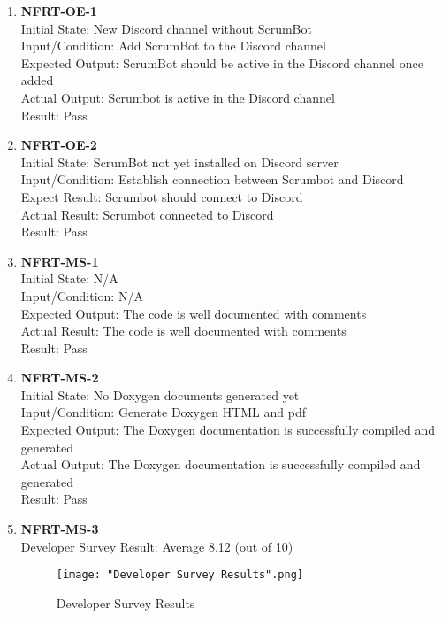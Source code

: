\documentclass[12pt, titlepage]{article}
\begin{document}
\begin{enumerate}
    \item{\textbf{NFRT-OE-1}}\\
    Initial State: New Discord channel without ScrumBot\\
    Input/Condition: Add ScrumBot to the Discord channel\\
    Expected Output: ScrumBot should be active in the Discord channel once added\\
    Actual Output: Scrumbot is active in the Discord channel\\
    Result: Pass
    
    \item{\textbf{NFRT-OE-2}}\\
    Initial State: ScrumBot not yet installed on Discord server\\
    Input/Condition: Establish connection between Scrumbot and Discord\\
    Expect Result: Scrumbot should connect to Discord\\
    Actual Result: Scrumbot connected to Discord\\
    Result: Pass

    \item{\textbf{NFRT-MS-1}}\\
    Initial State: N/A\\
    Input/Condition: N/A\\
    Expected Output: The code is well documented with comments\\
    Actual Result: The code is well documented with comments\\
    Result: Pass
    
    \item{\textbf{NFRT-MS-2}}\\
    Initial State: No Doxygen documents generated yet\\
    Input/Condition: Generate Doxygen HTML and pdf\\
    Expected Output: The Doxygen documentation is successfully compiled and generated\\
    Actual Output: The Doxygen documentation is successfully compiled and generated\\
    Result: Pass

    \item{\textbf{NFRT-MS-3}}\\
    Developer Survey Result: Average 8.12 (out of 10)
    \begin{figure}[H]
        \centering
        \texttt{[image: "Developer Survey Results".png]}
        \caption{Developer Survey Results}
    \end{figure}


\end{enumerate}
\end{document}
